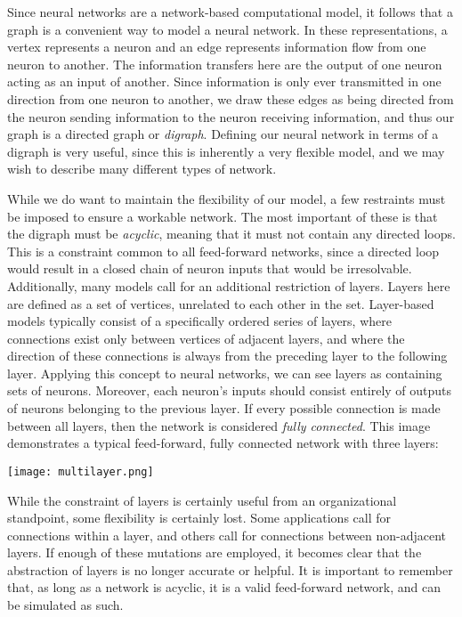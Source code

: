 \documentclass[a4paper, 11pt]{article} %
\begin{document}
Since neural networks are a network-based computational model, it follows that a graph is a convenient way to model a neural network.  In these representations, a vertex represents a neuron and an edge represents information flow from one neuron to another.  The information transfers here are the output of one neuron acting as an input of another.  Since information is only ever transmitted in one direction from one neuron to another, we draw these edges as being directed from the neuron sending information to the neuron receiving information, and thus our graph is a directed graph or \textit{digraph}.  Defining our neural network in terms of a digraph is very useful, since this is inherently a very flexible model, and we may wish to describe many different types of network.

While we do want to maintain the flexibility of our model, a few restraints must be imposed to ensure a workable network.  The most important of these is that the digraph must be \textit{acyclic}, meaning that it must not contain any directed loops.  This is a constraint common to all feed-forward networks, since a directed loop would result in a closed chain of neuron inputs that would be irresolvable.  Additionally, many models call for an additional restriction of layers.  Layers here are defined as a set of vertices, unrelated to each other in the set.  Layer-based models typically consist of a specifically ordered series of layers, where connections exist only between vertices of adjacent layers, and where the direction of these connections is always from the preceding layer to the following layer.  Applying this concept to neural networks, we can see layers as containing sets of neurons.  Moreover, each neuron's inputs should consist entirely of outputs of neurons belonging to the previous layer.  If every possible connection is made between all layers, then the network is considered \textit{fully connected}.  This image demonstrates a typical feed-forward, fully connected network with three layers:

\texttt{[image: multilayer.png]}

While the constraint of layers is certainly useful from an organizational standpoint, some flexibility is certainly lost.  Some applications call for connections within a layer, and others call for connections between non-adjacent layers.  If enough of these mutations are employed, it becomes clear that the abstraction of layers is no longer accurate or helpful.  It is important to remember that, as long as a network is acyclic, it is a valid feed-forward network, and can be simulated as such.
\end{document}
